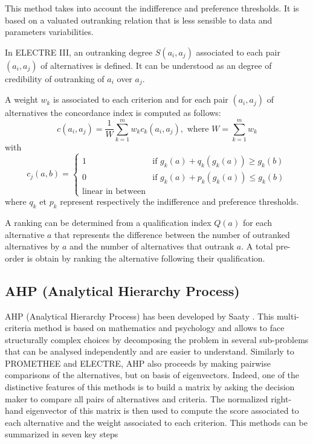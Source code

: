 \begin{enumerate}
This method takes into account the indifference and preference thresholds. It is based on a valuated outranking relation that is less sensible to data and parameters variabilities.

In ELECTRE III, an outranking degree $S(a_i, a_j)$ associated to each pair $(a_i, a_j)$ of alternatives is defined. It can be understood as an \og degree of credibility of outranking \fg of $a_i$ over $a_j$.

A weight $w_{k}$ is associated to each criterion and for each pair $(a_i, a_j)$ of alternatives the concordance index is computed as follows:
\begin{equation}
c(a_i, a_j) = \frac{1}{W} \sum_{k=1}^{m} w_{k} c_{k}(a_i, a_j), \text{ where } W = \sum_{k=1}^{m} w_{k}
\end{equation}
with
\begin{equation}
c_{j}(a,b) = \begin{cases}
	1& \text{if $g_{k}(a)+q_{k}(g_{k}(a)) \geq g_{k}(b)$}\\
	0& \text{if $g_{k}(a)+p_{k}(g_{k}(a)) \leq g_{k}(b)$}\\
	\text{linear in between}
	\end{cases}
\end{equation}
where $q_{k}$ et $p_{k}$ represent respectively the indifference and preference thresholds.

A ranking can be determined from a qualification index $Q(a)$ for each alternative $a$ that represents the difference between the number of outranked alternatives by $a$ and the number of alternatives that outrank $a$. A total pre-order is obtain by ranking the alternative following their qualification.

%
\end{enumerate}

\subsection{AHP (Analytical Hierarchy Process)}
AHP (Analytical Hierarchy Process) has been developed by Saaty \cite{MAHP}. This multi-criteria method is based on mathematics and psychology and allows to face structurally complex choices by decomposing the problem in several sub-problems that can be analysed independently and are easier to understand. Similarly to PROMETHEE and ELECTRE, AHP also proceeds by making pairwise comparisons of the alternatives, but on basis of eigenvectors. Indeed, one of the distinctive features of this methods is to build a matrix by asking the decision maker to compare all pairs of alternatives and criteria. The normalized right-hand eigenvector of this matrix is then used to compute the score associated to each alternative and the weight associated to each criterion. This methods can be summarized in seven key steps \cite{Vaidya20061}

